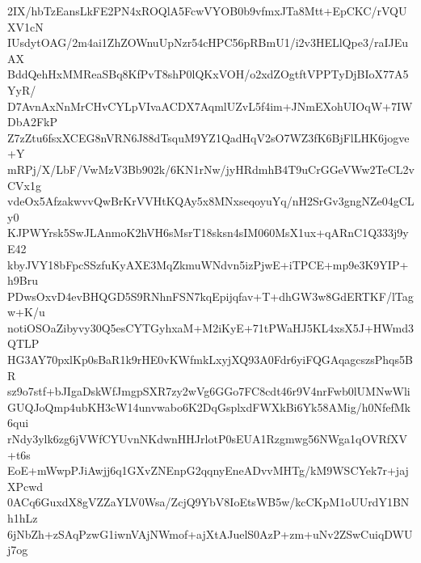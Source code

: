 2IX/hbTzEansLkFE2PN4xROQlA5FcwVYOB0b9vfmxJTa8Mtt+EpCKC/rVQUXV1cN
IUsdytOAG/2m4ai1ZhZOWnuUpNzr54cHPC56pRBmU1/i2v3HELlQpe3/raIJEuAX
BddQehHxMMReaSBq8KfPvT8shP0lQKxVOH/o2xdZOgtftVPPTyDjBIoX77A5YyR/
D7AvnAxNnMrCHvCYLpVIvaACDX7AqmlUZvL5f4im+JNmEXohUIOqW+7IWDbA2FkP
Z7zZtu6fsxXCEG8nVRN6J88dTsquM9YZ1QadHqV2sO7WZ3fK6BjFlLHK6jogve+Y
mRPj/X/LbF/VwMzV3Bb902k/6KN1rNw/jyHRdmhB4T9uCrGGeVWw2TeCL2vCVx1g
vdeOx5AfzakwvvQwBrKrVVHtKQAy5x8MNxseqoyuYq/nH2SrGv3gngNZe04gCLy0
KJPWYrsk5SwJLAnmoK2hVH6sMsrT18sksn4sIM060MsX1ux+qARnC1Q333j9yE42
kbyJVY18bFpcSSzfuKyAXE3MqZkmuWNdvn5izPjwE+iTPCE+mp9e3K9YIP+h9Bru
PDwsOxvD4evBHQGD5S9RNhnFSN7kqEpijqfav+T+dhGW3w8GdERTKF/lTagw+K/u
notiOSOaZibyvy30Q5esCYTGyhxaM+M2iKyE+71tPWaHJ5KL4xsX5J+HWmd3QTLP
HG3AY70pxlKp0sBaR1k9rHE0vKWfmkLxyjXQ93A0Fdr6yiFQGAqagcszsPhqs5BR
sz9o7stf+bJIgaDskWfJmgpSXR7zy2wVg6GGo7FC8cdt46r9V4nrFwb0lUMNwWli
GUQJoQmp4ubKH3cW14unvwabo6K2DqGsplxdFWXkBi6Yk58AMig/h0NfefMk6qui
rNdy3ylk6zg6jVWfCYUvnNKdwnHHJrlotP0sEUA1Rzgmwg56NWga1qOVRfXV+t6s
EoE+mWwpPJiAwjj6q1GXvZNEnpG2qqnyEneADvvMHTg/kM9WSCYek7r+jajXPcwd
0ACq6GuxdX8gVZZaYLV0Wsa/ZcjQ9YbV8IoEtsWB5w/kcCKpM1oUUrdY1BNh1hLz
6jNbZh+zSAqPzwG1iwnVAjNWmof+ajXtAJuelS0AzP+zm+uNv2ZSwCuiqDWUj7og
